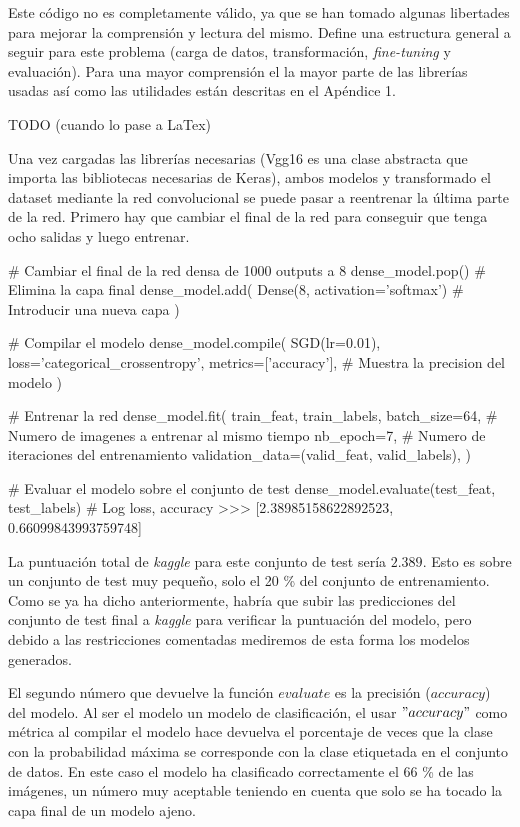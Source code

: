 Este código no es completamente válido, ya que se han tomado algunas libertades para mejorar la comprensión y lectura del mismo. Define una estructura general a seguir para este problema (carga de datos, transformación, \textit{fine-tuning} y evaluación). Para una mayor comprensión el la mayor parte de las librerías usadas así como las utilidades están descritas en el Apéndice 1.

TODO (cuando lo pase a LaTex)

Una vez cargadas las librerías necesarias (Vgg16 es una clase abstracta que importa las bibliotecas necesarias de Keras), ambos modelos y transformado el dataset mediante la red convolucional se puede pasar a reentrenar la última parte de la red. Primero hay que cambiar el final de la red para conseguir que tenga ocho salidas y luego entrenar.


\begin{python}

# Cambiar el final de la red densa de 1000 outputs a 8
dense_model.pop()  # Elimina la capa final
dense_model.add(
    Dense(8, activation='softmax')  # Introducir una nueva capa
)

# Compilar el modelo
dense_model.compile(
    SGD(lr=0.01),
    loss='categorical_crossentropy',
    metrics=['accuracy'],  # Muestra la precision del modelo
)

# Entrenar la red
dense_model.fit(
    train_feat,
    train_labels,
    batch_size=64,  # Numero de imagenes a entrenar al mismo tiempo
    nb_epoch=7,     # Numero de iteraciones del entrenamiento
    validation_data=(valid_feat, valid_labels),
)

# Evaluar el modelo sobre el conjunto de test
dense_model.evaluate(test_feat, test_labels)
# Log loss, accuracy
>>> [2.38985158622892523, 0.66099843993759748]
\end{python}

La puntuación total de \textit{kaggle} para este conjunto de test sería $2.389$. Esto es sobre un conjunto de test muy pequeño, solo el 20 \% del conjunto de entrenamiento. Como se ya ha dicho anteriormente, habría que subir las predicciones del conjunto de test final a \textit{kaggle} para verificar la puntuación del modelo, pero debido a las restricciones comentadas mediremos de esta forma los modelos generados.

El segundo número que devuelve la función $evaluate$ es la precisión ($accuracy$) del modelo. Al ser el modelo un modelo de clasificación, el usar $"accuracy"$ como métrica al compilar el modelo hace devuelva el porcentaje de veces que la clase con la probabilidad máxima se corresponde con la clase etiquetada en el conjunto de datos. En este caso el modelo ha clasificado correctamente el 66 \% de las imágenes, un número muy aceptable teniendo en cuenta que solo se ha tocado la capa final de un modelo ajeno.

